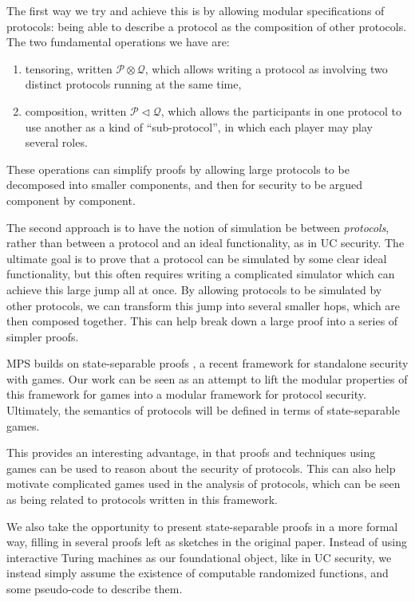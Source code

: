 The first way we try and achieve this is by allowing
modular specifications of protocols: being able to describe a protocol
as the composition of other protocols.
The two fundamental operations we have are:
\begin{enumerate}
\item tensoring, written $\mathscr{P} \otimes \mathscr{Q}$,
which allows writing a protocol as involving two distinct protocols
running at the same time,
\item composition, written $\mathscr{P} \lhd \mathscr{Q}$,
which allows the participants in one protocol to use another
as a kind of ``sub-protocol'', in which each player may play
several roles.
\end{enumerate}
These operations can simplify proofs by allowing large protocols
to be decomposed into smaller components,
and then for security to be argued component by component.

The second approach is to have the
notion of simulation be between \emph{protocols},
rather than between a protocol and an ideal functionality,
as in UC security.
The ultimate goal is to prove that a protocol can be simulated
by some clear ideal functionality,
but this often requires writing a complicated simulator
which can achieve this large jump all at once.
By allowing protocols to be simulated by other protocols,
we can transform this jump into several smaller hops,
which are then composed together.
This can help break down a large proof into a series of simpler proofs.

MPS builds on state-separable proofs \cite{AC:BDFKK18},
a recent framework for standalone security with games.
Our work can be seen as an attempt to lift the modular
properties of this framework for games into a modular
framework for protocol security.
Ultimately, the semantics of protocols will be defined in terms
of state-separable games.

This provides an interesting advantage, in that proofs
and techniques using games can be used to reason
about the security of protocols.
This can also help motivate complicated games used in the analysis
of protocols, which can be seen as being related to protocols
written in this framework.

We also take the opportunity to present state-separable proofs
in a more formal way, filling in several proofs left as sketches
in the original paper.
Instead of using interactive Turing machines as our foundational
object, like in UC security,
we instead simply assume the existence of computable randomized functions,
and some pseudo-code to describe them.

